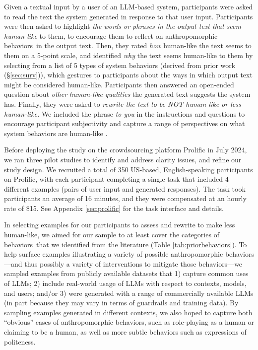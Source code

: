 \documentclass[11pt]{article}
\newcounter{intervention}  %
\newcommand{\cb}{behaviors}
\newcommand{\para}[1]{\smallskip \noindent {\bf #1}}
\begin{document}
Given a textual input by a user of an LLM-based system, participants were asked to read the text the system generated in response to that user input.
Participants were then asked to highlight \textit{the words or phrases in the output text that seem human-like} to them, to encourage them to reflect on anthropomorphic \cb~in the output text.
Then, they rated \textit{how} human-like the text seems to them on a 5-point scale,
and identified \textit{why} the text seems human-like to them by selecting from a list of 5 types of system behaviors (derived from prior work (\S\ref{sec:surv})), which gestures to participants about the ways in which output text might be considered human-like.
Participants then answered an open-ended question about \textit{other human-like qualities} the generated text suggests the system has.
Finally, they were asked to \textit{rewrite the text to be NOT human-like or less human-like.}
We included the phrase \textit{to you} in the instructions and questions to encourage participant subjectivity and capture a range of perspectives on what system behaviors are human-like \cite{rottger-etal-2022-two}.


Before deploying the study on the crowdsourcing platform Prolific in July 2024, we ran three pilot studies to identify and address clarity issues, and refine our study design. 
We recruited a total of 350 US-based, English-speaking participants on Prolific, with each participant completing a single task that included 4 different examples (pairs of user input and generated responses). 
The task took participants an average of 16 minutes, and they were compensated at an hourly rate of \$15.
See Appendix \ref{sec:prolific} for the task interface and details. 


\para{Selecting and annotating examples of generated texts.} 
In selecting examples for our participants to assess and rewrite to make less human-like, we aimed for our sample to at least cover the categories of \cb~that we identified from the literature (Table \ref{tab:priorbehaviors}). 
To help surface examples illustrating a variety of possible anthropomorphic behaviors---and thus possibly a variety of interventions to mitigate those behaviors---we sampled examples from publicly available datasets that 
1) capture common uses of LLMs; 
2) include real-world usage of LLMs with respect to contexts, models, and users; and/or
3) were generated with a range of commercially available LLMs (in part because they may vary in terms of guardrails and training data). 
By sampling examples generated in different contexts, we also hoped to capture both ``obvious'' cases of anthropomorphic behaviors, such as role-playing as a human or claiming to be a human, as well as more subtle behaviors such as expressions of politeness. 
\end{document}

